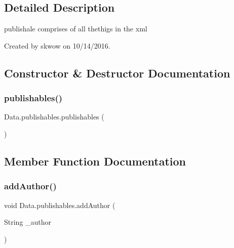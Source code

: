 \subsection{Detailed Description}
publishale comprises of all thethigs in the xml 

Created by skwow on 10/14/2016. 

\subsection{Constructor \& Destructor Documentation}
\hypertarget{class_data_1_1publishables_aceabba690b9f11b724b7ca0bb1bd6ed9}{}\label{class_data_1_1publishables_aceabba690b9f11b724b7ca0bb1bd6ed9} 
\subsubsection{\texorpdfstring{publishables()}{publishables()}}
{\footnotesize\ttfamily Data.\+publishables.\+publishables (\begin{DoxyParamCaption}{ }\end{DoxyParamCaption})}



\subsection{Member Function Documentation}
\hypertarget{class_data_1_1publishables_afefb90428e6d1ce4f699b4a4a10da4fa}{}\label{class_data_1_1publishables_afefb90428e6d1ce4f699b4a4a10da4fa} 
\subsubsection{\texorpdfstring{add\+Author()}{addAuthor()}}
{\footnotesize\ttfamily void Data.\+publishables.\+add\+Author (\begin{DoxyParamCaption}\item[{String}]{\+\_\+author }\end{DoxyParamCaption})}

\hypertarget{class_data_1_1publishables_a1ab3287a7eada2b725f7e1d735d235fa}{}\label{class_data_1_1publishables_a1ab3287a7eada2b725f7e1d735d235fa} 
